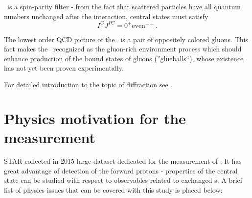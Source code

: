 \DPE\ is a spin-parity filter - from the fact that scattered particles have all quantum numbers unchanged after the interaction, central states must satisfy
\begin{equation}\label{eq:DPE_IGJPC}
 I^{G}J^{PC}=0^{+}\textrm{even}^{++}.
\end{equation}

The lowest order QCD picture of the \Pomeron\ is a pair of oppositely colored gluons. This fact makes the \DPE\ recognized as the gluon-rich environment process which should enhance production of the bound states of gluons (''glueballs``), whose existence has not yet been proven experimentally.

For detailed introduction to the topic of diffraction see \cite{pomeronAndQCD,barone}.\vspace*{-20pt}

\section{Physics motivation for the measurement}
STAR collected in 2015 large dataset dedicated for the measurement of \DPE. It has great advantage of detection of the forward protons - properties of the central state can be studied with respect to observables related to exchanged \Pomeron s. A brief list of physics issues that can be covered with this study is placed below: